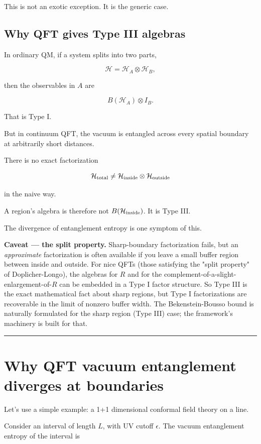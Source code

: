 \documentclass[11pt,a4paper]{article}
\begin{document}
This is not an exotic exception. It is the generic case.

\subsection{Why QFT gives Type III algebras}

In ordinary QM, if a system splits into two parts,

\[
\mathcal{H}=\mathcal{H}_A\otimes\mathcal{H}_B,
\]

then the observables in $A$ are

\[
B(\mathcal{H}_A)\otimes I_B.
\]

That is Type I.

But in continuum QFT, the vacuum is entangled across every spatial boundary at arbitrarily short distances.

There is no exact factorization

\[
\mathcal{H}_{\rm total}
\neq
\mathcal{H}_{\rm inside}\otimes \mathcal{H}_{\rm outside}
\]

in the naive way.

A region's algebra is therefore not $B(\mathcal{H}_{\rm inside})$. It is Type III.

The divergence of entanglement entropy is one symptom of this.

\textbf{Caveat — the split property.} Sharp-boundary factorization fails, but an \emph{approximate} factorization is often available if you leave a small buffer region between inside and outside. For nice QFTs (those satisfying the "split property" of Doplicher-Longo), the algebras for $R$ and for the complement-of-a-slight-enlargement-of-$R$ can be embedded in a Type I factor structure. So Type III is the exact mathematical fact about sharp regions, but Type I factorizations are recoverable in the limit of nonzero buffer width. The Bekenstein-Bousso bound is naturally formulated for the sharp region (Type III) case; the framework's machinery is built for that.

\medskip\hrule\medskip

\section{Why QFT vacuum entanglement diverges at boundaries}

Let’s use a simple example: a 1+1 dimensional conformal field theory on a line.

Consider an interval of length $L$, with UV cutoff $\epsilon$. The vacuum entanglement entropy of the interval is
\end{document}
